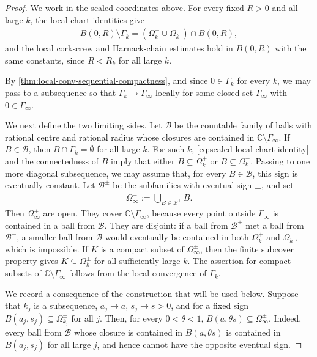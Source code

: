 \documentclass[11pt,a4paper,english,reqno]{amsart}
\numberwithin{equation}{section}
\newcommand{\CC}[0]{\mathbb{C}}
\renewcommand{\subset}{\subseteq}
\numberwithin{definition}{section}
\begin{document}
\begin{proof}
    We work in the scaled coordinates above.  For every fixed $R>0$ and all large $k$, the local chart identities give
    \begin{align}\label{eq:scaled-local-chart-identity}
        B(0,R)\setminus\Gamma_k
        = (\Omega_k^+\cup\Omega_k^-)\cap B(0,R),
    \end{align}
    and the local corkscrew and Harnack-chain estimates hold in $B(0,R)$ with the same constants, since $R<R_k$ for all large $k$.

    By \cref{thm:local-conv-sequential-compactness}, and since $0\in\Gamma_k$ for every $k$, we may pass to a subsequence so that $\Gamma_k\to\Gamma_\infty$ locally for some closed set $\Gamma_\infty$ with $0\in\Gamma_\infty$.

    We next define the two limiting sides.  Let $\mathcal B$ be the countable family of balls with rational centre and rational radius whose closures are contained in $\CC\setminus\Gamma_\infty$.  If $B\in\mathcal B$, then $\overline B\cap\Gamma_k=\emptyset$ for all large $k$.  For such $k$, \cref{eq:scaled-local-chart-identity} and the connectedness of $B$ imply that either $B\subset\Omega_k^+$ or $B\subset\Omega_k^-$.  Passing to one more diagonal subsequence, we may assume that, for every $B\in\mathcal B$, this sign is eventually constant.  Let $\mathcal B^\pm$ be the subfamilies with eventual sign $\pm$, and set
    \begin{align}
        \Omega_\infty^\pm:=\bigcup_{B\in\mathcal B^\pm} B .
    \end{align}
    Then $\Omega_\infty^\pm$ are open.  They cover $\CC\setminus\Gamma_\infty$, because every point outside $\Gamma_\infty$ is contained in a ball from $\mathcal B$.  They are disjoint: if a ball from $\mathcal B^+$ met a ball from $\mathcal B^-$, a smaller ball from $\mathcal B$ would eventually be contained in both $\Omega_k^+$ and $\Omega_k^-$, which is impossible.  If $K$ is a compact subset of $\Omega_\infty^\pm$, then the finite subcover property gives $K\subset\Omega_k^\pm$ for all sufficiently large $k$.  The assertion for compact subsets of $\CC\setminus\Gamma_\infty$ follows from the local convergence of $\Gamma_k$.

    We record a consequence of the construction that will be used below.
    Suppose that $k_j$ is a subsequence, $a_j\to a$, $s_j\to s>0$, and for a fixed sign $B(a_j,s_j)\subset\Omega_{k_j}^\pm$ for all $j$.  Then, for every $0<\theta<1$, $B(a,\theta s)\subset\Omega_\infty^\pm$.  Indeed, every ball from $\mathcal B$ whose closure is contained in $B(a,\theta s)$ is contained in $B(a_j,s_j)$ for all large $j$, and hence cannot have the opposite eventual sign.


\end{proof}
\end{document}
